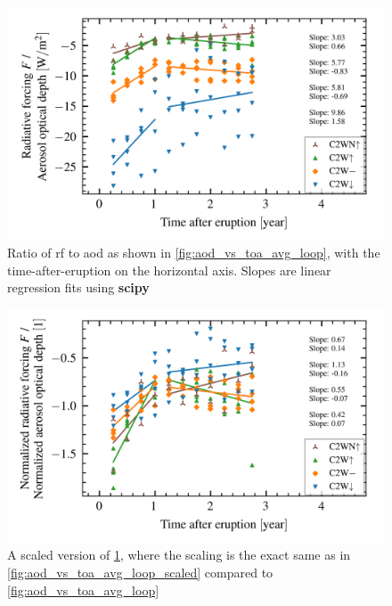 \documentclass[twocol]{ametsocV5}
\begin{document}
\begin{figure}[t]
  \begin{center}
    \includegraphics[width=0.95\linewidth]{figures/aod_vs_toa_avg_loop_ratio.png}
  \end{center}
  \caption{
    Ratio of \acrshort{rf} to \acrshort{aod} as shown in
    \cref{fig:aod_vs_toa_avg_loop}, with the time-after-eruption on the horizontal axis.
    Slopes are linear regression fits using \textbf{scipy}
  }%
  \label{fig:aod_vs_toa_avg_loop_ratio}
\end{figure}

\begin{figure}[t]
  \begin{center}
    \includegraphics[width=0.95\linewidth]{figures/aod_vs_toa_avg_loop_ratio_scaled.png}
  \end{center}
  \caption{
    A scaled version of \cref{fig:aod_vs_toa_avg_loop_ratio}, where the scaling is the
    exact same as in \cref{fig:aod_vs_toa_avg_loop_scaled} compared to
    \cref{fig:aod_vs_toa_avg_loop}
  }%
  \label{fig:aod_vs_toa_avg_loop_ratio_scaled}
\end{figure}
\end{document}
